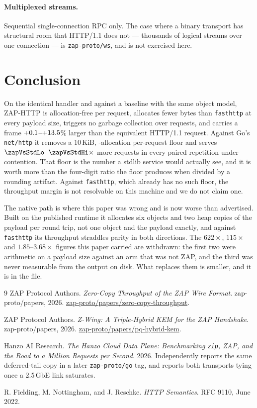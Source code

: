 \documentclass[11pt]{article}
\begin{document}
\paragraph{Multiplexed streams.} Sequential single-connection RPC only. The case
where a binary transport has structural room that HTTP/1.1 does not --- thousands
of logical streams over one connection --- is \texttt{zap-proto/ws}, and is not
exercised here.

\section{Conclusion}

On the identical handler and against a baseline with the same object model,
ZAP-HTTP is allocation-free per request, allocates fewer bytes than
\texttt{fasthttp} at every payload size, triggers no garbage collection over \memReqs
requests, and carries a frame $+0.1$--$+13.5$\% larger than the
equivalent HTTP/1.1 request. Against Go's \texttt{net/http} it removes a
10\,KiB, \allocsTiny-allocation
per-request floor\ifconcMeasured{} and serves
$\zapVsStdLo$--$\zapVsStdHi\times$ more requests in every paired repetition under
contention\fi. That floor is the number a stdlib service would actually see, and
it is worth more than the four-digit ratio the floor produces when divided by a
rounding artifact. Against \texttt{fasthttp}, which already has no such floor,
the throughput margin is not resolvable on this machine and we do not claim one.

The native path is where this paper was wrong and is now worse than advertised.
Built on the published runtime it allocates six objects and two heap copies of the
payload per round trip, not one object and the payload exactly, and against
\texttt{fasthttp} its throughput straddles parity in both directions. The $622\times$, $115\times$
and $1.85$--$3.68\times$ figures this paper carried are withdrawn: the first two
were arithmetic on a payload size against an arm that was not ZAP, and the third
was never measurable from the output on disk. What replaces them is smaller, and
it is in the file.


\begin{thebibliography}{9}
 ZAP Protocol Authors. \emph{Zero-Copy Throughput
of the ZAP Wire Format}. zap-proto/papers, 2026.
\href{https://github.com/zap-proto/papers/tree/main/zero-copy-throughput}
{zap-proto/papers/zero-copy-throughput}.

 ZAP Protocol Authors. \emph{Z-Wing: A Triple-Hybrid KEM for
the ZAP Handshake}. zap-proto/papers, 2026.
\href{https://github.com/zap-proto/papers/tree/main/pq-hybrid-kem}
{zap-proto/papers/pq-hybrid-kem}.

 Hanzo AI Research. \emph{The Hanzo Cloud Data Plane:
Benchmarking \texttt{zip}, ZAP, and the Road to a Million Requests per Second}.
2026. Independently reports the same deferred-tail copy in a later
\texttt{zap-proto/go} tag, and reports both transports tying once a 2.5\,GbE link
saturates.

 R. Fielding, M. Nottingham, and J. Reschke.
\emph{HTTP Semantics}. RFC 9110, June 2022.
\end{thebibliography}
\end{document}
